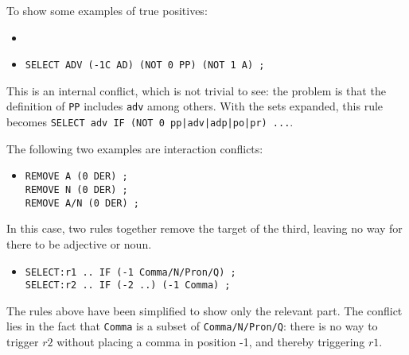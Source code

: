 To show some examples of true positives:


\begin{itemize}
\item[] 

\item[]\texttt{SELECT ADV (-1C AD) (NOT 0 PP) (NOT 1 A) ;}
\end{itemize}

This is an internal conflict, which is not trivial to see: the problem is that the definition of \texttt{PP} includes \texttt{adv} among others. With the sets expanded, this rule becomes \texttt{SELECT adv IF (NOT 0 pp|adv|adp|po|pr) ...}.

The following two examples are interaction conflicts:

\begin{itemize}
\item[]\begin{verbatim}
REMOVE A (0 DER) ; 
REMOVE N (0 DER) ; 
REMOVE A/N (0 DER) ; 
\end{verbatim}
\end{itemize}

In this case, two rules together remove the target of the third, leaving no way for there to be adjective or noun.

\begin{itemize}
\item[]\begin{verbatim}
SELECT:r1 .. IF (-1 Comma/N/Pron/Q) ;
SELECT:r2 .. IF (-2 ..) (-1 Comma) ;
\end{verbatim}
\end{itemize}

The rules above have been simplified to show only the relevant part.
The conflict lies in the fact that \texttt{Comma} is a subset of \texttt{Comma/N/Pron/Q}:
there is no way to trigger $r2$ without placing a comma in position -1, and thereby triggering $r1$.





